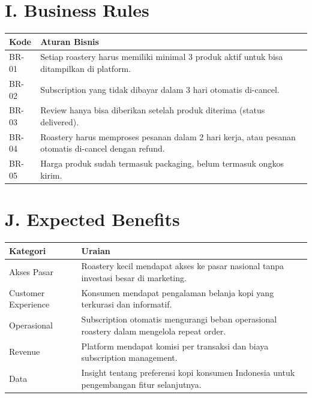 \documentclass[11pt,a4paper]{article}
\begin{document}
\section{I. Business Rules}
\noindent\small
\begin{tabularx}{\textwidth}{|p{1.2cm}|X|}
\hline
\centering\textbf{Kode}\arraybackslash & \centering\textbf{Aturan Bisnis}\arraybackslash \\\hline
BR-01 & Setiap roastery harus memiliki minimal 3 produk aktif untuk bisa ditampilkan di platform. \\\hline
BR-02 & Subscription yang tidak dibayar dalam 3 hari otomatis di-cancel. \\\hline
BR-03 & Review hanya bisa diberikan setelah produk diterima (status delivered). \\\hline
BR-04 & Roastery harus memproses pesanan dalam 2 hari kerja, atau pesanan otomatis di-cancel dengan refund. \\\hline
BR-05 & Harga produk sudah termasuk packaging, belum termasuk ongkos kirim. \\\hline
\end{tabularx}\normalsize

\section{J. Expected Benefits}
\noindent\small
\begin{tabularx}{\textwidth}{|p{3.2cm}|X|}
\hline
\centering\textbf{Kategori}\arraybackslash & \centering\textbf{Uraian}\arraybackslash \\\hline
Akses Pasar & Roastery kecil mendapat akses ke pasar nasional tanpa investasi besar di marketing. \\\hline
Customer Experience & Konsumen mendapat pengalaman belanja kopi yang terkurasi dan informatif. \\\hline
Operasional & Subscription otomatis mengurangi beban operasional roastery dalam mengelola repeat order. \\\hline
Revenue & Platform mendapat komisi per transaksi dan biaya subscription management. \\\hline
Data & Insight tentang preferensi kopi konsumen Indonesia untuk pengembangan fitur selanjutnya. \\\hline
\end{tabularx}\normalsize
\end{document}

